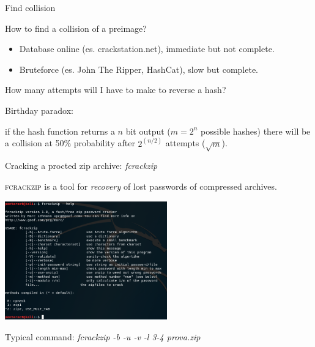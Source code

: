 \documentclass[handout, xcolor=dvipsnames,aspectratio=169]{beamer}
\begin{document}
\begin{frame}{Find collision}

    How to find a collision of a preimage?
    
    \pause

    \begin{itemize}
      \item Database online (es. crackstation.net), immediate but not complete.
      \item Bruteforce (es. John The Ripper, HashCat), slow but complete.
    \end{itemize}
    
    \medskip
    \pause
    
    How many attempts will I have to make to reverse a hash?

    \pause
    \medskip
    
    Birthday paradox:
    
    if the hash function returns a $ n $ bit output ($ m = 2 ^ n $ possible hashes) there will be a collision at 50\% probability after $2 ^ {(n / 2)} $ attempts ($\sqrt{m}$).
    
\end{frame}

\begin{frame}{Cracking a procted zip archive: \textit{fcrackzip}}

\textsc{fcrackzip} is a tool for \textit {recovery} of lost passwords of compressed archives.

\smallskip 

\centering

\includegraphics[width=7cm]{img/fcrackzip}

Typical command: \textit{fcrackzip -b -u -v -l 3-4 prova.zip}    

\end{frame}
\end{document}
